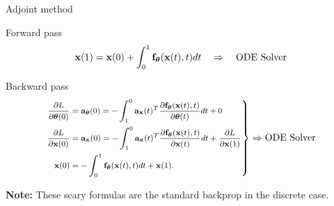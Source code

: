 \documentclass{beamer}
\begin{document}
\begin{frame}{Adjoint method}
	\begin{block}{Forward pass}
		\vspace{-0.3cm}
		\[
		\mathbf{x}(1) = \mathbf{x}(0) + \int^{1}_{0} \mathbf{f}_{\boldsymbol{\theta}}(\mathbf{x}(t), t) d t \quad \Rightarrow \quad \text{ODE Solver}
		\]
		\vspace{-0.4cm}
	\end{block}
	\begin{block}{Backward pass}
		\vspace{-0.5cm}
		\begin{equation*}
			\left.
			{\footnotesize 
				\begin{aligned}
					\frac{\partial L}{\partial \boldsymbol{\theta}(0)} &= \mathbf{a}_{\boldsymbol{\theta}}(0) =  - \int_{1}^{0} \mathbf{a}_{\mathbf{x}}(t)^T \frac{\partial \mathbf{f}_{\boldsymbol{\theta}}(\mathbf{x}(t), t)}{\partial \boldsymbol{\theta}(t)} dt + 0 \\
					\frac{\partial L}{\partial \mathbf{x}(0)} &= \mathbf{a}_{\mathbf{x}}(0) =  - \int_{1}^{0} \mathbf{a}_{\mathbf{x}}(t)^T \frac{\partial \mathbf{f}_{\boldsymbol{\theta}}(\mathbf{x}(t), t)}{\partial \mathbf{x}(t)} dt + \frac{\partial L}{\partial \mathbf{x}(1)} \\
					\mathbf{x}(0) &= - \int^{1}_{0} \mathbf{f}_{\boldsymbol{\theta}}(\mathbf{x}(t), t) d t  + \mathbf{x}(1).
				\end{aligned}
			}
			\right\rbrace
			\Rightarrow
			\text{ODE Solver}
		\end{equation*}
		\vspace{-0.4cm} 
	\end{block}
	\textbf{Note:} These scary formulas are the standard backprop in the discrete case.
\end{frame}
\end{document}
